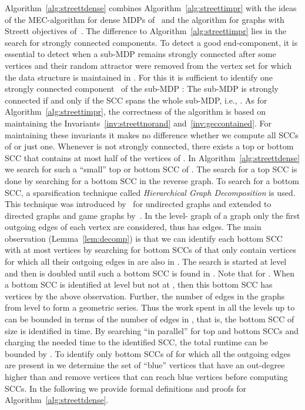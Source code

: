 \documentclass[11pt,letterpaper]{article}
\begin{document}
Algorithm~\ref{alg:streettdense} combines Algorithm~\ref{alg:streettimpr}
with the ideas of the MEC-algorithm for dense MDPs of~\cite{ChatterjeeH14} and 
the algorithm for graphs with Streett objectives of~\cite{ChatterjeeHL15}.
The difference to Algorithm~\ref{alg:streettimpr} lies in the search for 
strongly connected components. To detect a good end-component, it is essential 
to detect when a sub-MDP  remains strongly connected after some 
vertices and their random attractor were removed from the vertex 
set  for which the data structure  is
maintained in . For this it is sufficient to identify one 
strongly connected component~ of the sub-MDP :
The sub-MDP is strongly connected if and only if the SCC spans the whole 
sub-MDP, i.e., .
As for Algorithm~\ref{alg:streettimpr}, the correctness of the algorithm
is based on maintaining the Invariants~\ref{inv:streettnorand}
and~\ref{inv:geccontained}. For maintaining these invariants it makes no difference
whether we compute all SCCs of  or just one. Whenever  is not 
strongly connected, there exists a top or bottom SCC that contains at most 
half of the vertices of . In 
Algorithm~\ref{alg:streettdense} we search for such a ``small'' top or bottom
SCC of . 
The search for a top SCC is done by searching for a bottom SCC in the reverse
graph. To search for a bottom SCC,
a sparsification technique called \emph{Hierarchical Graph Decomposition}
is used. This technique was introduced by~\cite{HenzingerKW99} for undirected 
graphs and extended to directed graphs and game graphs by~\cite{ChatterjeeH14}.
In the level- graph  of a graph  only the first  outgoing edges 
of each vertex are considered, thus  has  edges. The main
observation (Lemma~\ref{lem:decomp}) is that we can identify each bottom SCC 
with at most  vertices by searching for bottom SCCs of  that 
only contain vertices for which all their outgoing edges in  are also in .
The search is started at level  and then  is doubled until such a bottom
SCC is found in . Note that  for . When a bottom 
SCC is identified at level  but not at , then this bottom SCC has 
 vertices by the above observation. Further, the number of 
edges in the graphs from level  to  form a geometric series. Thus 
the work spent in all the levels up to  can be bounded in terms of the number of
edges in , that is, the bottom SCC of size  is 
identified in  time. By searching ``in parallel'' for 
top and bottom SCCs and charging the needed time to the identified SCC, 
the total runtime can be bounded by . To identify only bottom SCCs of 
for which all the outgoing edges are present in  we determine the 
set of ``blue'' vertices  that have an out-degree higher than 
and remove vertices that can reach blue vertices before computing SCCs.
In the following we provide formal definitions and proofs for Algorithm~\ref{alg:streettdense}.
\end{document}
